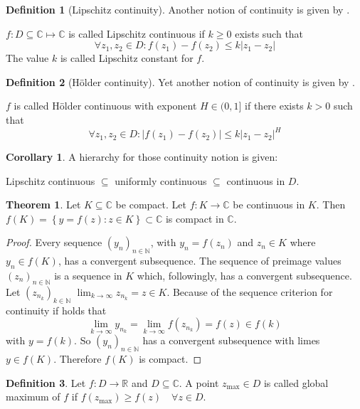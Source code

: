 \documentclass[a4paper,landscape,twocolumn]{article}
\theoremstyle{definition}
\newtheorem{theorem}{Theorem}
\newtheorem{defi}{Definition}
\newtheorem{cor}{Corollary}
\newcommand\set[1]{\left\{#1\right\}}
\newcommand\abs[1]{\left|#1\right|}
\begin{document}
%
\begin{defi}[Lipschitz continuity]
  Another notion of continuity is given by .

  $f: D \subseteq \mathbb C \mapsto \mathbb C$ is called Lipschitz continuous
  if $k \geq 0$ exists such that
  \[
    \forall z_1, z_2 \in D:
    f(z_1) - f(z_2) \leq k \abs{z_1 - z_2}
  \]
  The value $k$ is called Lipschitz constant for $f$.
\end{defi}
%
\begin{defi}[Hölder continuity]
  Yet another notion of continuity is given by .

  $f$ is called Hölder continuous with exponent $H \in (0, 1]$ if there exists
  $k > 0$ such that
  \[ \forall z_1, z_2 \in D: \abs{f(z_1) - f(z_2)} \leq k \abs{z_1 - z_2}^H \]
\end{defi}
%
\begin{cor}
  A hierarchy for those continuity notion is given:

  Lipschitz continuous $\subseteq$ uniformly continuous $\subseteq$ continuous in $D$.
\end{cor}
%
\begin{theorem}
  Let $K \subseteq \mathbb C$ be compact. Let $f: K \to \mathbb C$ be continuous
  in $K$. Then $f(K) = \set{y = f(z): z \in K} \subset \mathbb C$ is compact in $\mathbb C$.
\end{theorem}
\begin{proof}
  Every sequence $(y_n)_{n \in \mathbb N}$,
  with $y_n = f(z_n)$ and $z_n \in K$ where $y_n \in f(K)$,
  has a convergent subsequence. The sequence of preimage values $(z_n)_{n \in \mathbb N}$
  is a sequence in $K$ which, followingly, has a convergent subsequence.
  Let $(z_{n_k})_{k \in \mathbb N}$
  $\lim_{k \to \infty} z_{n_k} = z \in K$.
  Because of the sequence criterion for continuity if holds that
  \[ \lim_{k \to \infty} y_{n_k} = \lim_{k \to \infty} f(z_{n_k}) = f(z) \in f(k) \]
  with $y = f(k)$.
  So $(y_n)_{n \in \mathbb N}$ has a convergent subsequence with limes $y \in f(K)$.
  Therefore $f(K)$ is compact.
\end{proof}
%
\begin{defi}
  Let $f: D \to \mathbb R$ and $D \subseteq \mathbb C$. A point $z_{\text{max}} \in D$
  is called global maximum of $f$ if $f(z_{\text{max}}) \geq f(z) \quad\forall z \in D$.
\end{defi}
\end{document}

